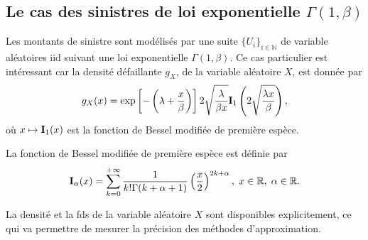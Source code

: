 \subsection{Le cas des sinistres de loi exponentielle $\Gamma(1,\beta)$}
Les montants de sinistre sont modélisés par une suite $\{U_{i}\}_{i\in\mathbb{N}}$ de variable aléatoires \gls{iid} suivant une loi exponentielle $\Gamma(1,\beta)$. Ce cas particulier est intéressant car la densité défaillante $g_{X}$, de la variable aléatoire $X$, est donnée par 
\begin{equation}\label{DefectiveDensityCompoundPoissonExponential}
g_{X}(x)=\exp\left[-\left(\lambda+\frac{x}{\beta}\right)\right]2\sqrt{\frac{\lambda}{\beta x}}\bold{I}_{1}\left(2\sqrt{\frac{\lambda x}{\beta}}\right),
\end{equation}
où $x\mapsto\bold{I}_{1}(x)$ est la fonction de Bessel modifiée de première espèce. 
\begin{Def}\label{ModifiedBesselFunctionDef} 
La fonction de Bessel modifiée de première espèce est définie par 
\begin{equation*}
\bold{I}_{\alpha}(x)=\sum_{k=0}^{+\infty}\frac{1}{k!\Gamma(k+\alpha+1)}\left(\frac{x}{2}\right)^{2k+\alpha},\hspace{0.1cm}x\in\mathbb{R},\hspace{0.1cm}\alpha\in\mathbb{R}.
\end{equation*}
\end{Def}
La densité et la \gls{fds} de la variable aléatoire $X$ sont disponibles explicitement, ce qui va permettre de mesurer la précision des méthodes d'approximation.\\

